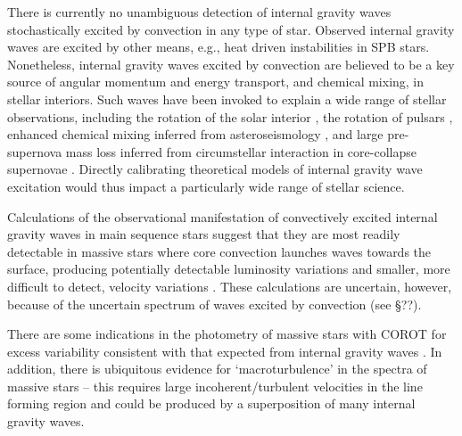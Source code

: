 There is currently no unambiguous detection of  internal gravity waves stochastically excited by convection in any type of star.  Observed internal gravity waves  are excited by other means, e.g., heat driven instabilities in SPB stars. Nonetheless, internal gravity waves excited by convection are believed to be a key source of angular momentum and energy transport, and chemical mixing, in stellar interiors.   Such waves have been invoked to explain a wide range of stellar observations, including the rotation of the solar interior \citep{Kumar_1999}, the rotation of pulsars \citep{fullerwave:15}, enhanced chemical mixing inferred from asteroseismology \citep{moravveji:15}, and large pre-supernova mass loss inferred from circumstellar interaction in core-collapse supernovae \citep{quataert:12}.   Directly calibrating theoretical models of internal gravity wave excitation would thus impact a particularly wide range of stellar science.

Calculations of the observational manifestation of convectively excited internal gravity waves in main sequence stars suggest that they are most readily detectable in massive stars where core convection launches waves towards the surface, producing potentially detectable luminosity variations and smaller, more difficult to detect, velocity variations \citep{samadi2010,shiode2013}.   These calculations are uncertain, however, because of the uncertain spectrum of waves excited by convection (see \S ??).   

There are some indications in the photometry of massive stars with COROT for excess variability consistent with that expected from internal gravity waves \citep{Aerts2015}.   In addition, there is ubiquitous evidence for `macroturbulence' in the spectra of massive stars -- this requires large incoherent/turbulent velocities in the line forming region and could be produced by a superposition of many internal gravity waves.

